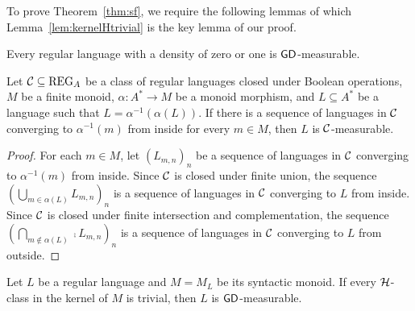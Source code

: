 To prove Theorem~\ref{thm:sf}, we require the following lemmas of which Lemma~\ref{lem:kernelHtrivial} is the key lemma of our proof.
\begin{lemma}\label{lem:zeroone}
Every regular language with a density of zero or one is \(\mathsf{GD}\)-measurable.
\end{lemma}
\begin{lemma}\label{lem:fiberinner}
Let \({\cal C} \subseteq \mathrm{REG}_A\) be a class of regular languages closed under Boolean operations, \(M\) be a finite monoid, \(\alpha\colon A^* \rightarrow M\) be a monoid morphism, and \(L \subseteq A^*\) be a language such that \(L = \alpha^{-1}(\alpha(L))\).
If there is a sequence of languages in \({\cal C}\) converging to \(\alpha^{-1}(m)\) from inside for every \(m \in M\), then \(L\) is \({\cal C}\)-measurable.
\end{lemma}
\begin{proof}
For each \(m \in M\), let \((L_{m,n})_n\) be a sequence of languages in \({\cal C}\) converging to \(\alpha^{-1}(m)\) from inside.
Since \({\cal C}\) is closed under finite union,
the sequence \((\bigcup_{m \in \alpha(L)} L_{m,n})_n\) is a sequence of languages in \({\cal C}\) converging to \(L\) from inside.
Since \({\cal C}\) is closed under finite intersection and complementation,
the sequence \((\bigcap_{m \not\in \alpha(L)} \comp{L_{m,n}})_n\) is a sequence of languages in \({\cal C}\) converging to \(L\) from outside.
\end{proof}
\begin{lemma}\label{lem:kernelHtrivial}
Let \(L\) be a regular language and \(M = M_L\) be its syntactic monoid.
If every \(\mathrel{\cal H}\)-class in the kernel of \(M\) is trivial, then
\(L\) is \(\mathsf{GD}\)-measurable.
\end{lemma}
